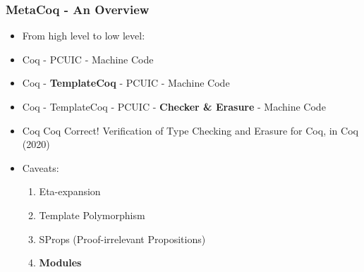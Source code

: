 \begin{frame}
    \frametitle{MetaCoq - An Overview}

    \begin{itemize}
    \item From high level to low level:
    \item Coq - PCUIC - Machine Code \pause
    \item Coq - \textbf{TemplateCoq} - PCUIC - Machine Code \pause
    \item Coq - TemplateCoq - PCUIC - \textbf{Checker \& Erasure} - Machine Code\pause
    \item Coq Coq Correct! Verification of Type Checking and Erasure
        for Coq, in Coq (2020)\pause
    \item Caveats:\pause
    \begin{enumerate}
    \item Eta-expansion
    \item Template Polymorphism
    \item SProps (Proof-irrelevant Propositions)
    \item \textbf{Modules}
    \end{enumerate}
    
    \end{itemize}
\end{frame}


    
